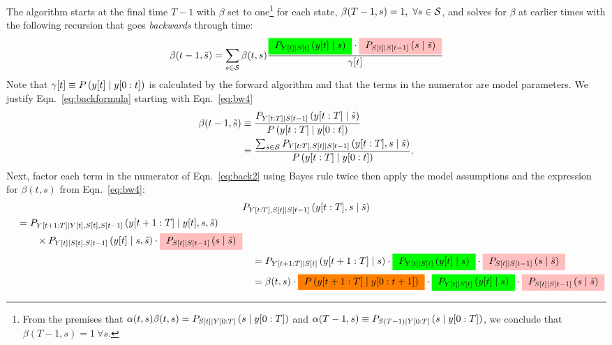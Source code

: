 The algorithm starts at the final time $T-1$ with $\beta$ set to
one\footnote{From the premises that $\alpha(t,s) \beta(t,s) =
  P_{{S}{[t]}\mid Y[0:T]} \left(s\mid y[0:T] \right)$ and
  $\alpha(T-1,s) \equiv P_{S(T-1)\mid Y[0:T]}\left(s \mid y[0:T]
  \right)$, we conclude that $\beta(T-1,s) = 1 ~\forall s$.} %
for each state, $\beta(T-1,s) = 1,~\forall s \in \states$, and solves
for $\beta$ at earlier times with the following recursion that goes
\emph{backwards} through time:
\begin{equation}
  \label{eq:backformula}
  \beta(t-1,{\tilde s}) = \sum_{s\in\states} \beta(t,s)
  \frac{ \BackUpdate{t} \cdot \Backcast{t}{t-1}{\tilde s}} {\ti{\gamma}{t}}
\end{equation}
Note that ${{\gamma}{[t]} \equiv P \left( {y}{[t]} \mid 
    y[0:t]\right)}$ is calculated by the forward algorithm and
that the terms in the numerator are model parameters.  We justify
Eqn.~\eqref{eq:backformula} starting with Eqn.~\eqref{eq:bw4}
\begin{align}
  \beta(t-1,{\tilde s}) & \equiv \frac{P_{\ts{Y}{t}{T}\given \ti{S}{t-1}}
    \left(\ts{y}{t}{T}\given {\tilde s} \right)}
  {P \left(\ts{y}{t}{T}\given \ts{y}{0}{t} \right)} \\
  \mlabel{eq:back2}
  &= \frac{\sum_{s\in\states} P_{\ts{Y}{t}{T},\ti{S}{t}\given \ti{S}{t-1}}
    \left(\ts{y}{t}{T},s\given {\tilde s} \right)} {P
    \left(\ts{y}{t}{T}\given \ts{y}{0}{t} \right)}.
\end{align}
Next, factor each term in the numerator of Eqn.~\eqref{eq:back2} using
Bayes rule twice then apply the model assumptions and the expression
for $\beta(t,s)$ from Eqn.~\eqref{eq:bw4}:
\begin{align*}
  & P_{\ts{Y}{t}{T},\ti{S}{t}\given \ti{S}{t-1}}\left( \ts{y}{t}{T},s\given {\tilde s} \right)\\
  \begin{split}
    &\quad= P_{\ts{Y}{t+1}{T}\given \ti{Y}{t},\ti{S}{t},\ti{S}{t-1}}
       \left(\ts{y}{t+1}{T}\given \ti{y}{t},s,{\tilde s} \right)\\
    &\quad\qquad \times P_{\ti{Y}{t}\given \ti{S}{t},\ti{S}{t-1}} \left(\ti{y}{t}\given s,{\tilde s}
       \right)\cdot \Backcast{t}{t-1}{\tilde s}
  \end{split}\\
  &\quad= P_{\ts{Y}{t+1}{T}\given \ti{S}{t}} \left(\ts{y}{t+1}{T}\given s\right)
           \cdot \BackUpdate{t} \cdot \Backcast{t}{t-1}{\tilde s} \\
  &\quad= \beta(t,s) \cdot \FuturePast \cdot \BackUpdate{t} \cdot
    \Backcast{t}{t-1}{\tilde s}
\end{align*}
